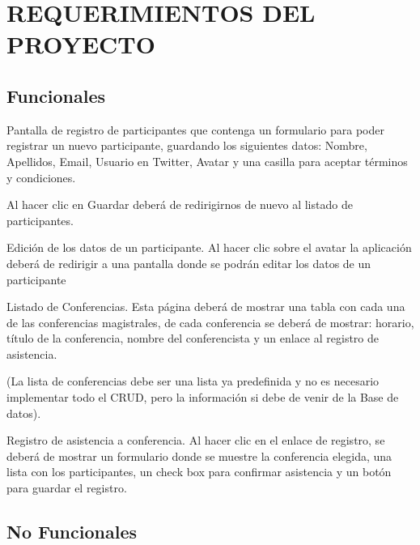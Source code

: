 \chapter{REQUERIMIENTOS DEL PROYECTO}

\setcounter{cRequerimientos}{0}
\newcommand{\IncReq}{\addtocounter{cRequerimientos}{1}}


\section{Funcionales}
\begin{list}{RF\_\IncReq\thecRequerimientos}{}
	\item Pantalla de registro de participantes que contenga un formulario para poder registrar un nuevo participante, guardando los siguientes datos: Nombre, Apellidos, Email, Usuario en Twitter, Avatar y una casilla para aceptar términos y condiciones.
	
	Al hacer clic en Guardar deberá de redirigirnos de nuevo al listado de participantes.
	
	\item Edición  de los datos de un participante.  Al hacer clic sobre el avatar la aplicación deberá de redirigir 
	a una pantalla donde se podrán editar los datos de un participante
	
	\item Listado de Conferencias. Esta página deberá de mostrar una tabla con cada una de las conferencias magistrales, de cada conferencia se deberá de mostrar: horario, título de la conferencia, nombre del conferencista y un enlace al registro de asistencia.
	
	(La lista de conferencias debe ser una lista ya predefinida y no es necesario implementar todo el CRUD, pero la información si debe de venir de la Base de datos).
	
	\item Registro de asistencia a conferencia. Al hacer clic en el enlace de registro, se deberá de mostrar un formulario donde se muestre la conferencia elegida, una lista con los participantes, un check box para confirmar asistencia y un botón para guardar el registro.
	
	
\end{list}

\section{No Funcionales}

